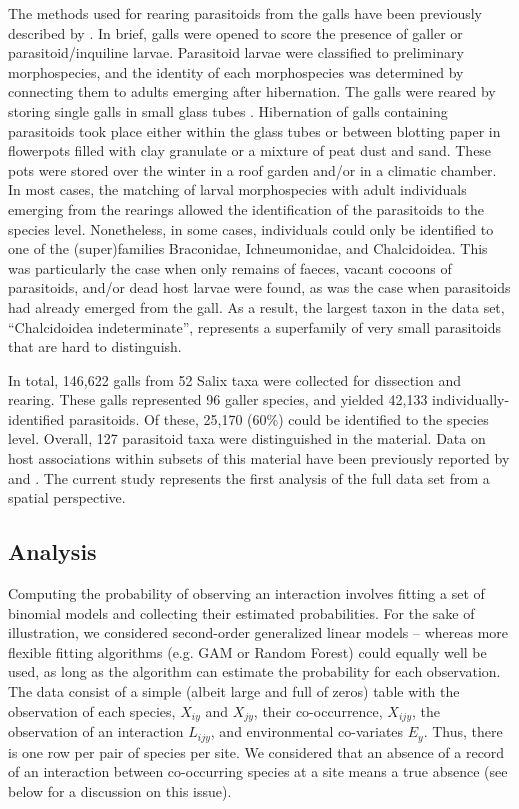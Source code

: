 \documentclass[12pt]{article}
\begin{document}
The methods used for rearing parasitoids from the galls have been
previously described by \citealt{Kopelke2003}. In brief, galls were
opened to score the presence of galler or parasitoid/inquiline larvae. Parasitoid
larvae were classified to preliminary morphospecies, and the identity of each
morphospecies was determined by connecting them to adults emerging after
hibernation. The galls were reared by storing single galls in small glass
tubes \citep{Kopelke1985a}. Hibernation of galls containing parasitoids took place
either within the glass tubes or between blotting paper in flowerpots filled
with clay granulate or a mixture of peat dust and sand. These pots were stored
over the winter in a roof garden and/or in a climatic chamber. In most cases,
the matching of larval morphospecies with adult individuals emerging from the
rearings allowed the identification of the parasitoids to the species
level. Nonetheless, in some cases, individuals could only be identified to one
of the (super)families Braconidae, Ichneumonidae, and Chalcidoidea. This was
particularly the case when only remains of faeces, vacant cocoons of
parasitoids, and/or dead host larvae were found, as was the case when
parasitoids had already emerged from the gall. As a result, the largest taxon
in the data set, ``Chalcidoidea indeterminate'', represents a superfamily of
very small parasitoids that are hard to distinguish.

In total, 146,622 galls from 52 Salix taxa were collected for dissection and
rearing. These galls represented 96 galler species, and yielded 42,133
individually-identified parasitoids. Of these, 25,170 (60\%) could be
identified to the species level. Overall, 127 parasitoid taxa were
distinguished in the material. Data on host associations within subsets of
this material have been previously reported by \citep{Kopelke1999} and
\citep{Nyman2007}. The current study represents the first analysis of
the full data set from a spatial perspective.

\subsection*{Analysis}  

Computing the probability of observing an interaction involves fitting a set
of binomial models and collecting their estimated probabilities. For the sake
of illustration, we considered second-order generalized linear models –
whereas more flexible fitting algorithms (e.g. GAM or Random Forest)
could equally well be used, as long as the algorithm can estimate the
probability for each observation. The data consist of a simple (albeit large
and full of zeros) table with the observation of each species, $X_{iy}$ and $X_{jy}$,
their co-occurrence, $X_{ijy}$, the observation of an interaction $L_{ijy}$, and
environmental co-variates $E_y$. Thus, there is one row per pair of species per
site. We considered that an absence of a record of an interaction between co-occurring
species at a site means a true absence (see below for a discussion
on this issue).
\end{document}

